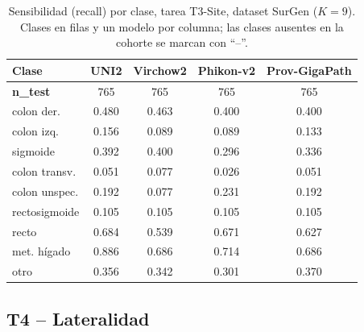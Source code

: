 \begin{table}[H]
\centering
\caption{Sensibilidad (recall) por clase, tarea T3-Site, dataset SurGen ($K=9$). Clases en filas y un modelo por columna; las clases ausentes en la cohorte se marcan con ``--''.}
\label{tab:anexo_site_sensibilidad_surgen}
\begin{tabular}{l c c c c}
\toprule
\textbf{Clase} & \textbf{UNI2} & \textbf{Virchow2} & \textbf{Phikon-v2} & \textbf{Prov-GigaPath} \\
\midrule
\textbf{n\_test} & 765 & 765 & 765 & 765 \\
colon der. & 0.480 & 0.463 & 0.400 & 0.400 \\
colon izq. & 0.156 & 0.089 & 0.089 & 0.133 \\
sigmoide & 0.392 & 0.400 & 0.296 & 0.336 \\
colon transv. & 0.051 & 0.077 & 0.026 & 0.051 \\
colon unspec. & 0.192 & 0.077 & 0.231 & 0.192 \\
rectosigmoide & 0.105 & 0.105 & 0.105 & 0.105 \\
recto & 0.684 & 0.539 & 0.671 & 0.627 \\
met. hígado & 0.886 & 0.686 & 0.714 & 0.686 \\
otro & 0.356 & 0.342 & 0.301 & 0.370 \\
\bottomrule
\end{tabular}
\end{table}

\subsection{T4 -- Lateralidad}

